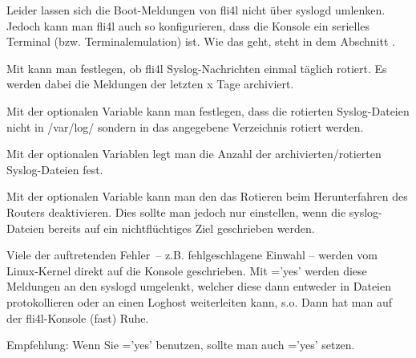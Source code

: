 \begin{description}
  Leider lassen sich die Boot-Meldungen von fli4l nicht über syslogd
  umlenken. Jedoch kann man fli4l auch so konfigurieren, dass die
  Konsole ein serielles Terminal (bzw. Terminalemulation) ist. Wie das
  geht, steht in dem Abschnitt .


  Mit  kann man festlegen, ob fli4l Syslog-Nachrichten
  einmal täglich rotiert. Es werden dabei die Meldungen der letzten x Tage
  archiviert.


  Mit der optionalen Variable  kann man festlegen,
  dass die rotierten Syslog-Dateien nicht in /var/log/ sondern in das angegebene
  Verzeichnis rotiert werden.


  Mit der optionalen Variablen  legt man die Anzahl der
  archivierten/rotierten Syslog-Dateien fest.


  Mit der optionalen Variable  kann man den das Rotieren
  beim Herunterfahren des Routers deaktivieren. Dies sollte man jedoch nur einstellen, wenn
  die syslog-Dateien bereits auf ein nichtflüchtiges Ziel geschrieben werden.

\end{description}



  Viele der auftretenden Fehler~-- z.B. fehlgeschlagene Einwahl --
  werden vom Linux-Kernel direkt auf die Konsole geschrieben. Mit
  ='yes' werden diese Meldungen an den syslogd umgelenkt,
  welcher diese dann entweder in Dateien protokollieren oder an einen
  Loghost weiterleiten kann, s.o. Dann hat man auf der fli4l-Konsole
  (fast) Ruhe.

  \noindent Empfehlung: Wenn Sie ='yes' benutzen, sollte man auch
  ='yes' setzen.

